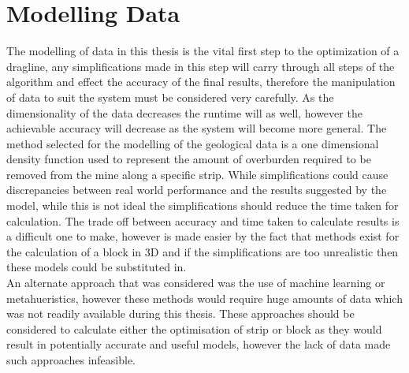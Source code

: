
\section{Modelling Data}
The modelling of data in this thesis is the vital first step to the optimization of a dragline, any simplifications made in this step will carry through all steps of the algorithm and effect the accuracy of the final results, therefore the manipulation of data to suit the system must be considered very carefully. As the dimensionality of the data decreases the runtime will as well, however the achievable accuracy will decrease as the system will become more general. The method selected for the modelling of the geological data is a one dimensional density function used to represent the amount of overburden required to be removed from the mine along a specific strip. 
While simplifications could cause discrepancies between real world performance and the results suggested by the model, while this is not ideal the simplifications should reduce the time taken for calculation. The trade off between accuracy and time taken to calculate results is a difficult one to make, however is made easier by the fact that methods exist for the calculation of a block in 3D \cite{ORLeslie}and if the simplifications are too unrealistic then these models could be substituted in. 
\\


An alternate approach that was considered was the use of machine learning or metahueristics, however these methods would require huge amounts of data \cite{Meta} which was not readily available during this thesis. These approaches should be considered  to calculate either the optimisation of strip or block as they would result in potentially accurate and useful models, however the lack of data made such approaches infeasible.

